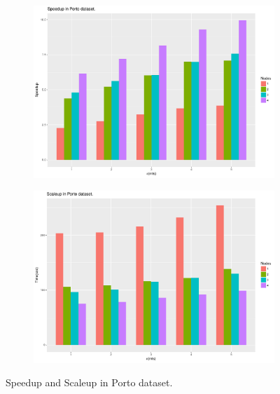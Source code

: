 \documentclass[12pt]{scrartcl}
\begin{document}
\begin{figure}
\centering
\begin{subfigure}{.5\textwidth}
  \centering \includegraphics[width=\linewidth]{figures/2_Porto_Speedup}
\end{subfigure}%
\begin{subfigure}{.5\textwidth}
  \centering \includegraphics[width=\linewidth]{figures/3_Porto_Scaleup}
\end{subfigure}
\caption{Speedup and Scaleup in Porto dataset.}
\label{fig:SSPorto}
\end{figure}
\end{document}
